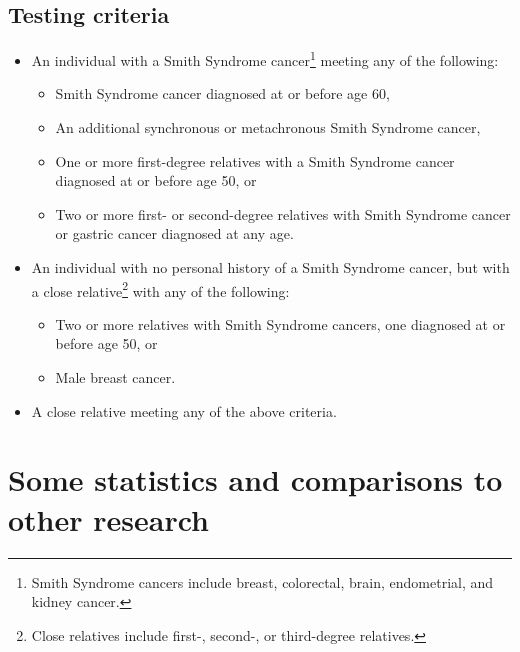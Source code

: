 \documentclass[review]{elsarticle}
\begin{document}
\subsection*{Testing criteria}
\begin{itemize}[noitemsep]

    \item An individual with a Smith Syndrome cancer\footnote{Smith Syndrome
    cancers include breast, colorectal, brain, endometrial, and kidney
    cancer.} meeting any of the following:

    \begin{itemize}[noitemsep, nolistsep]
        \item Smith Syndrome cancer diagnosed at or before age 60,
        \item An additional synchronous or metachronous Smith Syndrome
        cancer,
        \item One or more first-degree relatives with a Smith Syndrome
        cancer diagnosed at or before age 50, or
        \item Two or more first- or second-degree relatives with Smith
        Syndrome cancer or gastric cancer diagnosed at any age.

    \end{itemize}

    \item An individual with no personal history of a Smith Syndrome cancer,
        but with a close relative\footnote{Close relatives include first-,
        second-, or third-degree relatives.} with any of the following:

    \begin{itemize}[noitemsep, nolistsep]

        \item Two or more relatives with Smith Syndrome cancers, one diagnosed
        at or before age 50, or
        \item Male breast cancer.

    \end{itemize}

    \item A close relative meeting any of the above criteria.

\end{itemize}

\section{Some statistics and comparisons to other research}

\blindtext[2]
\end{document}
